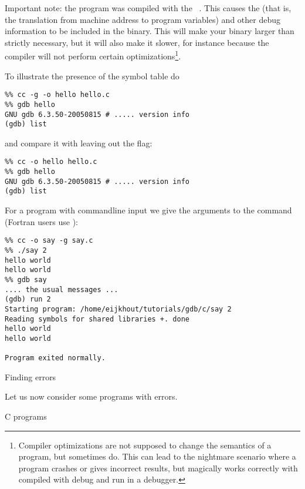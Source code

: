 Important note: the program was compiled with the ~. This causes the  (that is, the
translation from machine address to program variables) and other debug
information to be included in the binary. This will make your binary
larger than strictly necessary, but it will also make it slower, for
instance because the compiler will not perform certain
optimizations\footnote{Compiler optimizations are not supposed to
  change the semantics of a program, but sometimes do. This can lead
  to the nightmare scenario where a program crashes or gives incorrect
  results, but magically works correctly with compiled with debug and
  run in a debugger.}.

To illustrate the presence of the symbol table do
\begin{verbatim}
%% cc -g -o hello hello.c
%% gdb hello
GNU gdb 6.3.50-20050815 # ..... version info
(gdb) list
\end{verbatim}
and compare it with leaving out the  flag:
\begin{verbatim}
%% cc -o hello hello.c
%% gdb hello
GNU gdb 6.3.50-20050815 # ..... version info
(gdb) list
\end{verbatim}

For a program with commandline input we give the arguments to the
 command (Fortran users use ):
\begin{verbatim}
%% cc -o say -g say.c
%% ./say 2
hello world
hello world
%% gdb say
.... the usual messages ...
(gdb) run 2
Starting program: /home/eijkhout/tutorials/gdb/c/say 2
Reading symbols for shared libraries +. done
hello world
hello world

Program exited normally.
\end{verbatim}

 {Finding errors}

Let us now consider some programs with errors.

 {C programs}

